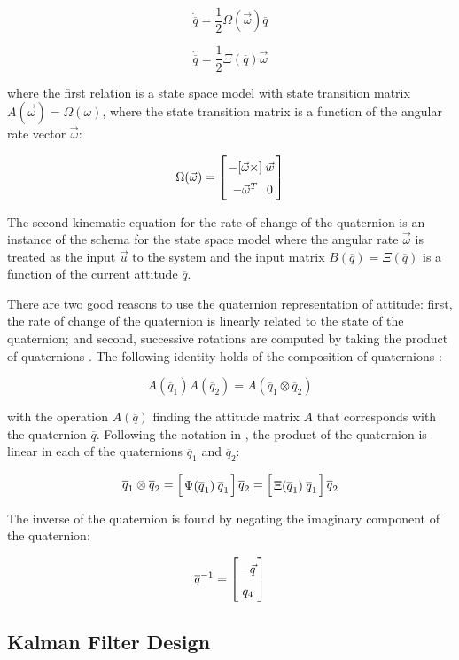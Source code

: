 \documentclass{article}
\newcommand{\mat}[2][ccccccccccccccccccccccccccccccccccccccccccccc]{\left[
        \arraycolsep=1.2pt\def\arraystretch{1.5}
        \begin{array}{#1} #2 \\ 
        \end{array} 
        \right]}
\begin{document}
\begin{flushleft}
\[ \dot{\overline{q}} = \frac{1}{2} \Omega( \vec{\omega} ) \overline{q} \]

\[ \dot{\overline{q}} = \frac{1}{2} \Xi( \overline{q} )\vec{\omega} \]

where the first relation is a state space model with state transition matrix $A(\vec{\omega}) = \Omega(\omega)$, where the state transition matrix is a function of the angular rate vector $\vec{\omega}$:

\[ \Omega(\vec{\omega}) = \mat{ -[\vec{\omega}\times] & \vec{w} \\ -\vec{\omega}^T & 0 } \] 

The second kinematic equation for the rate of change of the quaternion is an instance of the schema for the state space model where the angular rate $\vec{\omega}$ is treated as the input $\vec{u}$ to the system and the input matrix $B(\overline{q}) = \Xi(\overline{q})$ is a function of the current attitude $\overline{q}$. 

\medskip

There are two good reasons to use the quaternion representation of attitude: first, the rate of change of the quaternion is linearly related to the state of the quaternion; and second, successive rotations are computed by taking the product of quaternions \cite{Markley2007}. The following identity holds of the composition of quaternions \cite{Shuster1982}: 

\[ A(\overline{q}_1) A(\overline{q}_2) = A(\overline{q}_1 \otimes \overline{q}_2) \]

with the operation $A(\overline{q})$ finding the attitude matrix $A$ that corresponds with the quaternion $\overline{q}$. Following the notation in \cite{Markley2007}, the product of the quaternion is linear in each of the quaternions $\overline{q}_1$ and $\overline{q}_2$: 

\[ \overline{q}_1 \otimes \overline{q}_2 = \mat{ \Psi({\overline{q}_1}) & \overline{q}_1} \overline{q}_2 = \mat{ \Xi({\overline{q}_1}) & \overline{q}_1 } \overline{q}_2 \]

The inverse of the quaternion is found by negating the imaginary component of the quaternion: 

\[ \overline{q}^{-1} = \mat{ -\vec{q} \\ q_4 } \]

\subsection{Kalman Filter Design} 


\end{flushleft}
\end{document}
